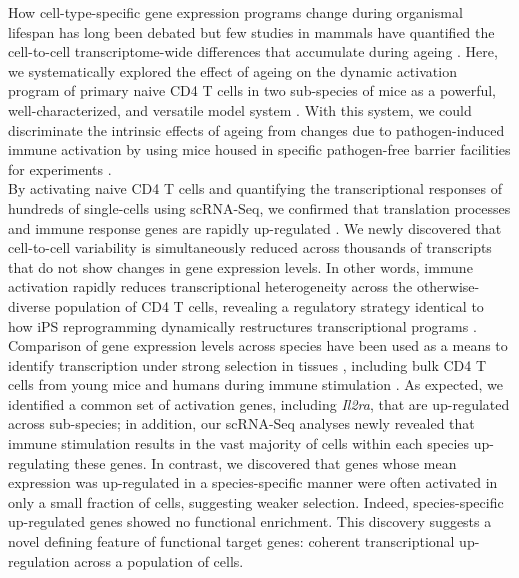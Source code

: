 How cell-type-specific gene expression programs change during organismal lifespan has long been debated \citep{Bahar2006, Warren2007} but few studies in mammals have quantified the cell-to-cell transcriptome-wide differences that accumulate during ageing \citep{Kowalczyk2015}. Here, we systematically explored the effect of ageing on the dynamic activation program of primary naive CD4\plus{} T cells in two sub-species of mice as a powerful, well-characterized, and versatile model system \citep{Shay2013}. With this system, we could discriminate the intrinsic effects of ageing from changes due to pathogen-induced immune activation by using mice housed in specific pathogen-free barrier facilities for experiments \citep{Beura2016}.\\

By activating naive CD4\plus{} T cells and quantifying the transcriptional responses of hundreds of single-cells using scRNA-Seq, we confirmed that translation processes and immune response genes are rapidly up-regulated \citep{Neme2016, Asmal2003}. We newly discovered that cell-to-cell variability is simultaneously reduced across thousands of transcripts that do not show changes in gene expression levels. In other words, immune activation rapidly reduces transcriptional heterogeneity across the otherwise-diverse population of CD4\plus{} T cells, revealing a regulatory strategy identical to how iPS reprogramming dynamically restructures transcriptional programs \citep{Buganim2012}. \\

Comparison of gene expression levels across species have been used as a means to identify transcription under strong selection in tissues \citep{Brawand2011, Sudmant2015, Romero2012, Barbosa-Morais2012, Perry2012}, including bulk CD4\plus{} T cells from young mice and humans during immune stimulation \citep{Shay2013}. As expected, we identified a common set of activation genes, including \textit{Il2ra}, that are up-regulated across sub-species; in addition, our scRNA-Seq analyses newly revealed that immune stimulation results in the vast majority of cells within each species up-regulating these genes. In contrast, we discovered that genes whose mean expression was up-regulated in a species-specific manner were often activated in only a small fraction of cells, suggesting weaker selection. Indeed, species-specific up-regulated genes showed no functional enrichment. This discovery suggests a novel defining feature of functional target genes: coherent transcriptional up-regulation across a population of cells. \\


